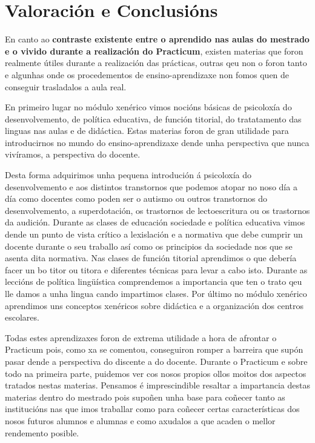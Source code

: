 

\chapter{Valoración e Conclusións}\label{chap:valoracion}




En canto ao \textbf{contraste existente entre o aprendido nas aulas do mestrado e o vivido durante a realización do Practicum}, existen materias que foron realmente útiles durante a realización das prácticas, outras qeu non o foron tanto e algunhas onde os procedementos de ensino-aprendizaxe non fomos quen de conseguir trasladalos a aula real.

En primeiro lugar no módulo xenérico vimos nocións básicas de psicoloxía do desenvolvemento, de política educativa, de función titorial, do tratatamento das linguas nas aulas e de didáctica. Estas materias foron de gran utilidade para introducirnos no mundo do ensino-aprendizaxe dende unha perspectiva que nunca vivíramos, a perspectiva do docente.

Desta forma adquirimos unha pequena introdución á psicoloxía do desenvolvemento e aos distintos transtornos que podemos atopar no noso día a día como docentes como poden ser o autismo ou outros transtornos do desenvolvemento, a superdotación, os trastornos de lectoescritura ou os trastornos da audición. Durante as clases de educación sociedade e política educativa vimos dende un punto de vista crítico a lexislación e a normativa que debe cumprir un docente durante o seu traballo así como os principios da sociedade nos que se asenta dita normativa. Nas clases de función titorial aprendimos o que debería facer un bo titor ou titora e diferentes técnicas para levar a cabo isto. Durante as leccións de política lingüística comprendemos a importancia que ten o trato qeu lle damos a unha lingua cando impartimos clases. Por último no módulo xenérico aprendimos uns conceptos xenéricos sobre didáctica e a organización dos centros escolares.

Todas estes aprendizaxes foron de extrema utilidade a hora de afrontar o Practicum pois, como xa se comentou, conseguiron romper a barreira que supón pasar dende a perspectiva do discente a do docente. Durante o Practicum e sobre todo na primeira parte, puidemos ver cos nosos propios ollos moitos dos aspectos tratados nestas materias. Pensamos é imprescindible resaltar a impartancia destas materias dentro do mestrado pois supoñen unha base para coñecer tanto as institucións nas que imos traballar como para coñecer certas características dos nosos futuros alumnos e alumnas e como axudalos a que acaden o mellor rendemento posible.

